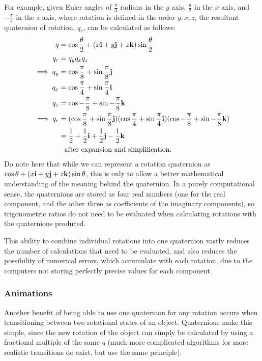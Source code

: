 \documentclass[10pt]{article}
\begin{document}
For example, given Euler angles of $\frac{\pi}{4}$ radians in the $y$ axis, $\frac{\pi}{2}$ in the $x$ axis, and $-\frac{\pi}{4}$ in the $z$ axis, where rotation is defined in the order $y, x, z$, the resultant quaternion of rotation, $q_r$, can be calculated as follows:
\begin{equation}
    \begin{aligned}
        q &= \cos\frac{\theta}{2}+ (x\vb{i} + y\vb{j} + z\vb{k})\sin\frac{\theta}{2} \\
        q_r &= q_yq_xq_z \\
        \implies q_y &= \cos\frac{\pi}{8} + \sin\frac{\pi}{8}\vb{j} \\
        q_x &= \cos\frac{\pi}{4} + \sin\frac{\pi}{4}\vb{i} \\
        q_z &= \cos-\frac{\pi}{8} + \sin-\frac{\pi}{8}\vb{k} \\
        \implies q_r &= (\cos\frac{\pi}{8} + \sin\frac{\pi}{8}\vb{j})(\cos\frac{\pi}{4} + \sin\frac{\pi}{4}\vb{i})(\cos-\frac{\pi}{8} + \sin-\frac{\pi}{8}\vb{k}) \\
                     &= \frac{1}{2} + \frac{1}{2}\vb{i} + \frac{1}{2}\vb{j} - \frac{1}{2}\vb{k} \\
                     &\phantom{= } \text {after expansion and simplification.}
    \end{aligned}
\end{equation}
Do note here that while we can represent a rotation quaternion as $\cos\theta + (x\vb{i} + y\vb{j} + z\vb{k})\sin\theta$, this is only to allow a better mathematical understanding of the meaning behind the quaternion. In a purely computational sense, the quaternions are stored as four real numbers (one for the real component, and the other three as coefficients of the imaginary components), so trigonometric ratios do not need to be evaluated when calculating rotations with the quaternions produced.

This ability to combine individual rotations into one quaternion vastly reduces the number of calculations that need to be evaluated, and also reduces the possibility of numerical errors, which accumulate with each rotation, due to the computers not storing perfectly precise values for each component.

\subsubsection{Animations}

Another benefit of being able to use one quaternion for any rotation occurs when transitioning between two rotational states of an object. Quaternions make this simple, since the new rotation of the object can simply be calculated by using a fractional multiple of the same $q$ (much more complicated algorithms for more realistic transitions do exist, but use the same principle).
\end{document}
